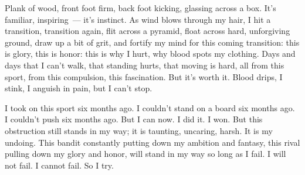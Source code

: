 Plank of wood, front foot firm, back foot kicking, glassing across a box. It's familiar, inspiring~--- it's instinct. As wind blows through my hair, I hit a transition, transition again, flit across a pyramid, float across hard, unforgiving ground, draw up a bit of grit, and fortify my mind for this coming transition: this is glory, this is honor: this is why I hurt, why blood spots my clothing. Days and days that I can't walk, that standing hurts, that moving is hard, all from this sport, from this compulsion, this fascination. But it's worth it. Blood drips, I stink, I anguish in pain, but I can't stop.

I took on this sport six months ago. I couldn't stand on a board six months ago. I couldn't push six months ago. But I can now. I did it. I won. But this obstruction still stands in my way; it is taunting, uncaring, harsh. It is my undoing. This bandit constantly putting down my ambition and fantasy, this rival pulling down my glory and honor, will stand in my way so long as I fail. I will not fail. I cannot fail. So I try.

